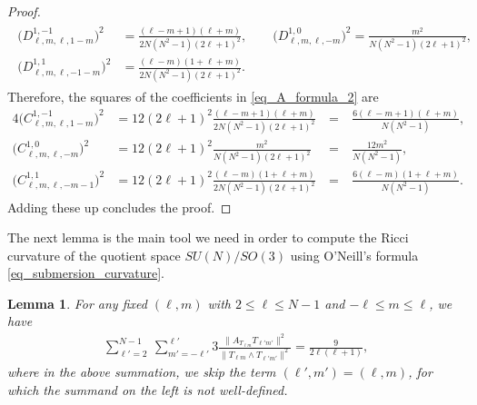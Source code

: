 \documentclass[11pt]{amsart}
\numberwithin{equation}{section}
\newtheorem{lemma}{Lemma}
\theoremstyle{definition}
\begin{document}
\begin{proof}
\begin{gather*}
\begin{split}
\Big(D_{\ell, m,\ell, 1-m}^{1,-1}\Big)^2
&= 
\frac{(\ell-m+1)(\ell+m)}{2N(N^2-1)(2\ell+1)^2},
\qquad \Big(D_{\ell, m,\ell, -m}^{1,0}\Big)^2
= 
\frac{m^2}{N(N^2-1)(2\ell+1)^2},
\\
\Big(D_{\ell, m,\ell,-1-m}^{1,1}\Big)^2
&= 
\frac{(\ell-m)(1+\ell+m)}{2N(N^2-1)(2\ell+1)^2}.
\end{split}
\end{gather*}
Therefore, the squares of the coefficients in \eqref{eq_A_formula_2} are
\begin{alignat*}{4}
\Big(C_{\ell,m,\ell,1-m}^{1,-1}\Big)^2 &= 12(2\ell+1)^2\frac{(\ell-m+1)(\ell+m)}{2N(N^2-1)(2\ell+1)^2} ~&=~
&\frac{6(\ell-m+1)(\ell+m)}{N(N^2-1)},&
\\ 
\Big(C_{\ell,m,\ell,-m}^{1,0}\Big)^2 &=
12(2\ell+1)^2\frac{m^2}{N(N^2-1)(2\ell+1)^2} ~&=~
&\frac{12m^2}{N(N^2-1)},&
\\
\Big(C_{\ell,m,\ell,-m-1}^{1,1}\Big)^2 &=
12(2\ell+1)^2\frac{(\ell-m)(1+\ell+m)}{2N(N^2-1)(2\ell+1)^2} ~&=~ &\frac{6(\ell-m)(1+\ell+m)}{N(N^2-1)}.&
\end{alignat*}
Adding these up concludes the proof.
\end{proof}
The next lemma is the main tool we need in order to compute the Ricci curvature of the quotient space $SU(N)/SO(3)$ using O'Neill's formula 
\eqref{eq_submersion_curvature}. 

\begin{lemma}\label{lemma_A_XY}
For any fixed $(\ell,m)$ with $2 \leq \ell \leq N-1$ and $-\ell \leq m \leq \ell$, we have
\begin{align*}
\sum\limits_{\ell' = 2}^{N-1}
~\sum\limits_{m' = -\ell'}^{\ell'} 3\frac{\|A_{T_{\ell m}}T_{\ell'm'}\|^2}{\|T_{\ell m} \wedge T_{\ell'm'}\|^2} = \frac{9}{2\ell(\ell+1)},
\end{align*}
where in the above summation, we skip the term $(\ell', m') = (\ell, m)$, for which the summand on the left is not well-defined.
\end{lemma}
\end{document}
